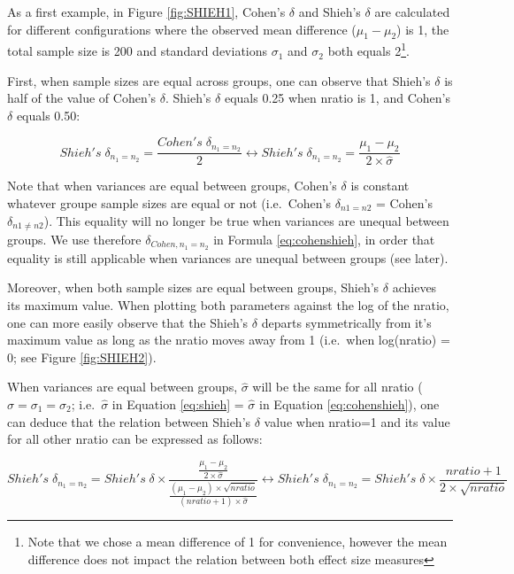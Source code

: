 \documentclass[
  man]{apa6}
\begin{document}
As a first example, in Figure \ref{fig:SHIEH1}, Cohen's \(\delta\) and Shieh's \(\delta\) are calculated for different configurations where the observed mean difference (\(\mu_{1}-\mu_{2}\)) is 1, the total sample size is 200 and standard deviations \(\sigma_{1}\) and \(\sigma_{2}\) both equals 2\footnote{Note that we chose a mean difference of 1 for convenience, however the mean difference does not impact the relation between both effect size measures}.

First, when sample sizes are equal across groups, one can observe that Shieh's \(\delta\) is half of the value of Cohen's \(\delta\). Shieh's \(\delta\) equals 0.25 when nratio is 1, and Cohen's \(\delta\) equals 0.50:

\begin{equation} 
Shieh's \; \delta_{n_1=n_2} = \frac{Cohen's \; \delta_{n_1=n_2}}{2}
\leftrightarrow Shieh's \; \delta_{n_1=n_2}= \frac{\mu_1-\mu_2}{2 \times \hat{\sigma}} 
\label{eq:cohenshieh}
\end{equation}

Note that when variances are equal between groups, Cohen's \(\delta\) is constant whatever groupe sample sizes are equal or not (i.e.~Cohen's \(\delta_{n1=n2}\) = Cohen's \(\delta_{n1 \neq n2}\)). This equality will no longer be true when variances are unequal between groups. We use therefore \(\delta_{Cohen, n_1=n_2}\) in Formula \ref{eq:cohenshieh}, in order that equality is still applicable when variances are unequal between groups (see later).

Moreover, when both sample sizes are equal between groups, Shieh's \(\delta\) achieves its maximum value. When plotting both parameters against the log of the nratio, one can more easily observe that the Shieh's \(\delta\) departs symmetrically from it's maximum value as long as the nratio moves away from 1 (i.e.~when log(nratio) = 0; see Figure \ref{fig:SHIEH2}).

When variances are equal between groups, \(\hat{\sigma}\) will be the same for all nratio (\(\hat{\sigma}=\sigma_1=\sigma_2\); i.e.~\(\hat{\sigma}\) in Equation \ref{eq:shieh} = \(\hat{\sigma}\) in Equation \ref{eq:cohenshieh}), one can deduce that the relation between Shieh's \(\delta\) value when nratio=1 and its value for all other nratio can be expressed as follows:

\begin{equation} 
Shieh's \; \delta_{n_1=n_2} = Shieh's \; \delta \times \frac{\frac{\mu_1-\mu_2}{2 \times \hat{\sigma}}}{\frac{(\mu_1-\mu_2) \times \sqrt{nratio}}{(nratio+1) \times \hat{\sigma}}}
\leftrightarrow Shieh's \; \delta_{n_1=n_2} = Shieh's \; \delta \times \frac{nratio+1}{2 \times \sqrt{nratio}}
\label{eq:shiehvsmax}
\end{equation}
\end{document}
